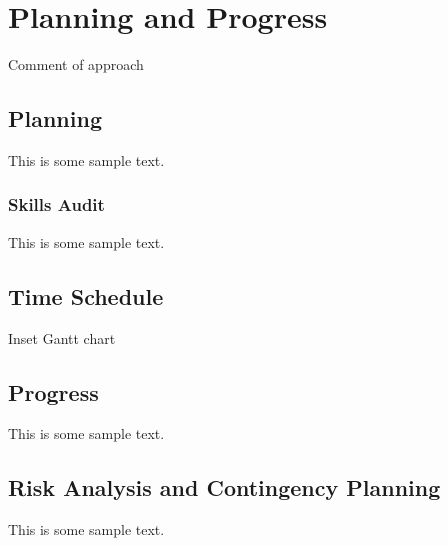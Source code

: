 \chapter{Planning and Progress}

Comment of approach

\section{Planning}

This is some sample text.

\subsection{Skills Audit}

This is some sample text.

\section{Time Schedule}

Inset Gantt chart

\section{Progress}

This is some sample text.

\section{Risk Analysis and Contingency Planning}

This is some sample text.

